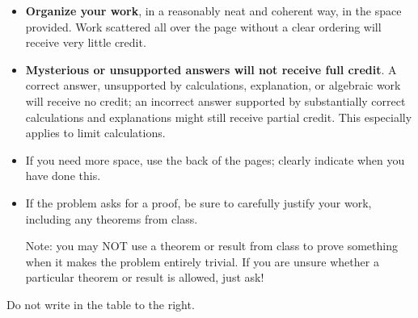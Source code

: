 \documentclass[11pt]{exam}
\theoremstyle{definition}
\begin{document}
\begin{minipage}[t]{3.7in}
\vspace{0pt}
\begin{itemize}


\item \textbf{Organize your work}, in a reasonably neat and coherent way, in
the space provided. Work scattered all over the page without a clear ordering will 
receive very little credit.  

\item \textbf{Mysterious or unsupported answers will not receive full
credit}.  A correct answer, unsupported by calculations, explanation,
or algebraic work will receive no credit; an incorrect answer supported
by substantially correct calculations and explanations might still receive
partial credit.  This especially applies to limit calculations.

\item If you need more space, use the back of the pages; clearly indicate when you have done this.

\item If the problem asks for a proof, be sure to carefully justify your work, including any theorems from class.

Note: you may NOT use a theorem or result from class to prove something when it makes the problem entirely trivial.  If you are unsure whether a particular theorem or result is allowed, just ask!

\end{itemize}

Do not write in the table to the right.
\end{minipage}
\hfill
\begin{minipage}[t]{2.3in}
\vspace{0pt}
\addpoints %
\gradetable[v]%

\end{minipage}
\newpage %

%
%
%
\end{document}
